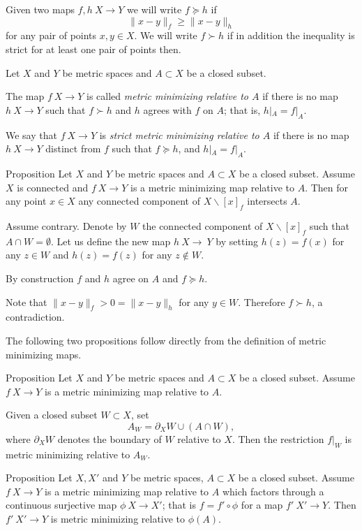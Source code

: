 \documentclass[a4paper,10pt]{amsart}
\begin{document}
Given two maps $f,h\:X\to Y$ we will write $f\succcurlyeq h$ if 
\[\|x-y\|_f\ge \|x-y\|_h\]
for any pair of points $x,y\in X$.
We will write $f\succ h$ 
if in addition the inequality is strict for at least one pair of points then.



Let $X$ and $Y$ be metric spaces and $A\subset X$ be a closed subset.

The map $f\:X\to Y$ is called \emph{metric minimizing relative to $A$}
if there is no map $h\:X\to Y$ such that $f\succ h$
and $h$ agrees with $f$ on $A$;
that is, $h|_A=f|_A$.

We say that $f\:X\to Y$ is \emph{strict metric minimizing relative to $A$}
if there is no map $h\:X\to Y$ distinct from $f$
such that $f\succcurlyeq h$, 
and $h|_A=f|_A$.

\begin{thm}{Proposition}\label{prop:point-complement}
Let $X$ and $Y$ be metric spaces 
and $A\subset X$ be a closed subset.
Assume $X$ is connected and $f\:X\to Y$ is a metric minimizing map relative to $A$.
Then for any point $x\in X$ any connected component of $X\backslash [x]_f$ intersects $A$.

\end{thm}

Assume contrary.
Denote by $W$ the connected component of $X\backslash [x]_f$ such that $A\cap W=\emptyset$.
Let us define the new map $h\:X\to\ Y$ 
by setting $h(z)=f(x)$ for any $z\in W$
and $h(z)=f(z)$ for any $z\notin W$.

By construction $f$ and $h$ agree on $A$ and $f\succcurlyeq h$.

Note that $\|x-y\|_f>0=\|x-y\|_h$ for any $y\in W$.
Therefore $f\succ h$, a contradiction.
\qeds

The following two propositions follow directly from the definition of metric minimizing maps.

\begin{thm}{Proposition}\label{prop:subset}
Let $X$ and $Y$ be metric spaces and $A\subset X$ be a closed subset.
Assume $f\:X\to Y$ is a metric minimizing map relative to $A$.

Given a closed subset $W\subset X$, set 
\[A_W=\partial_X W\cup (A\cap W),\]
where $\partial_X W$ denotes the boundary of $W$ relative to $X$.
Then the restriction $f|_W$ is metric minimizing relative to $A_W$.
\end{thm}

\begin{thm}{Proposition}\label{prop:factor}
Let $X, X'$ and $Y$ be metric spaces, 
$A\subset X$ be a closed subset.
Assume $f\:X\to Y$ is a metric minimizing map relative to $A$
which factors through a continuous surjective map $\phi\:X\to X'$;
that is $f=f'\circ\phi$ for a map $f'\:X'\to Y$.
Then $f'\:X'\to Y$ is metric minimizing relative to $\phi(A)$.
\end{thm}
\end{document}

